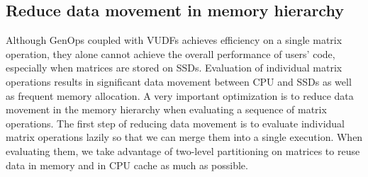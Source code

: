 

\subsection{Reduce data movement in memory hierarchy}
Although GenOps coupled with VUDFs achieves efficiency on a single matrix
operation, they alone cannot achieve the overall performance of users' code,
especially when matrices are stored on SSDs. Evaluation of individual matrix
operations results in significant data movement between CPU and SSDs
as well as frequent memory allocation. A very important optimization
is to reduce data movement in the memory hierarchy when evaluating a sequence
of matrix operations. The first step of reducing data movement is to evaluate
individual matrix operations lazily so that we can merge them into a single
execution. When evaluating them, we take advantage of two-level partitioning
on matrices to reuse data in memory and in CPU cache as much as possible.

